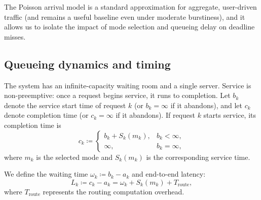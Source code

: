 \documentclass[preprint,12pt]{elsarticle}
\begin{document}
The Poisson arrival model is a standard approximation for aggregate, user-driven traffic (and remains a useful baseline even under moderate burstiness), and it allows us to isolate the impact of mode selection and queueing delay on deadline misses. 

\subsection{Queueing dynamics and timing}
\label{sec:queue_dynamics}

The system has an infinite-capacity waiting room and a single server. Service is non-preemptive: once a request begins service, it runs to completion. Let $b_k$ denote the service start time of request $k$ (or $b_k=\infty$ if it abandons), and let $c_k$ denote completion time (or $c_k=\infty$ if it abandons). If request $k$ starts service, its completion time is
\begin{equation}
c_k \coloneqq 
\begin{cases}
b_k + S_k(m_k), & b_k < \infty,\\
\infty, & b_k = \infty,
\end{cases}
\end{equation}
where $m_k$ is the selected mode and $S_k(m_k)$ is the corresponding service time.

We define the waiting time $\omega_k \coloneqq b_k - a_k$ and end-to-end latency:
\begin{equation}
L_k \coloneqq c_k - a_k = \omega_k + S_k(m_k) + T_{\text{route}},
\end{equation}
where $T_{\text{route}}$ represents the routing computation overhead.
\end{document}

